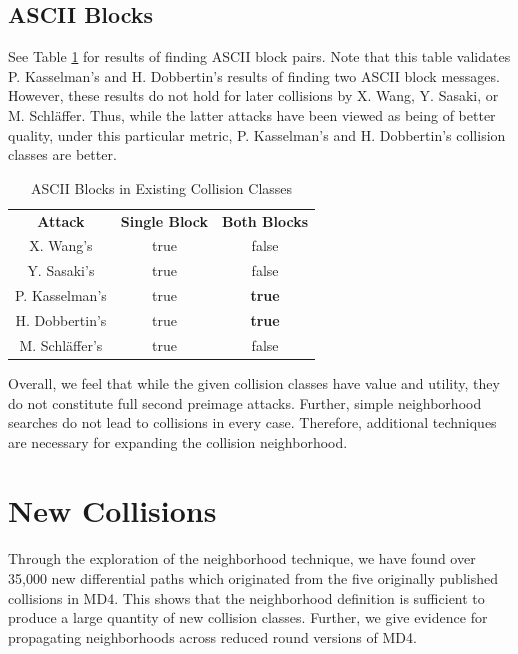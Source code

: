 \documentclass[conference]{IEEEtran}
\begin{document}
\subsection{ASCII Blocks}

See Table \ref{table:ascii} for results of finding ASCII block pairs. Note that
this table validates P. Kasselman's and H. Dobbertin's results of finding
two ASCII block messages. However, these results do not hold for later
collisions by X. Wang, Y. Sasaki, or M. Schl{\"a}ffer. Thus, while the latter
attacks have been viewed as being of better quality, under this particular
metric, P. Kasselman's and H. Dobbertin's collision classes are better.

\begin{table}
    \caption{ASCII Blocks in Existing Collision Classes}
    \label{table:ascii}
    \begin{tabular}{c c c}
        \textbf{Attack} & \textbf{Single Block} & \textbf{Both Blocks} \\
        X. Wang's & true & false \\
        Y. Sasaki's & true & false \\
        P. Kasselman's & true & \textbf{true} \\
        H. Dobbertin's & true & \textbf{true} \\
        M. Schl{\"a}ffer's & true & false \\
    \end{tabular}
\end{table}

Overall, we feel that while the given collision classes have value and utility,
they do not constitute full second preimage attacks. Further, simple
neighborhood searches do not lead to collisions in every case. Therefore,
additional techniques are necessary for expanding the collision neighborhood.

\section{New Collisions} \label{Sec:Collision}

Through the exploration of the neighborhood technique, we have found over
35,000 new differential paths which originated from the five originally published
collisions in MD4. This shows that the neighborhood definition is sufficient
to produce a large quantity of new collision classes. Further, we give
evidence for propagating neighborhoods across reduced round versions of MD4.
\end{document}
